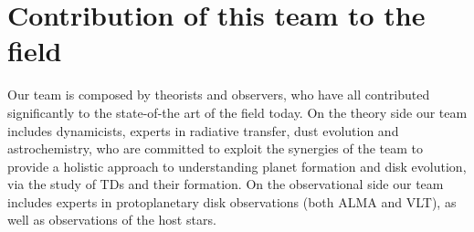 \documentclass[10pt,fleqn,twoside]{article}
\begin{document}


\section{Contribution of this team to the field }
%

Our team is composed by theorists and observers, who have all
contributed significantly to the state-of-the art of the field today. 
On the theory side our team includes
dynamicists, experts in radiative transfer, dust evolution and astrochemistry, who are
committed to exploit the synergies of the team to provide a holistic
approach to understanding planet formation and disk evolution, via the
study of TDs and their formation. On the observational side our
team includes experts in protoplanetary disk observations (both
ALMA and VLT), as well as observations of the host stars.\\
\end{document}
